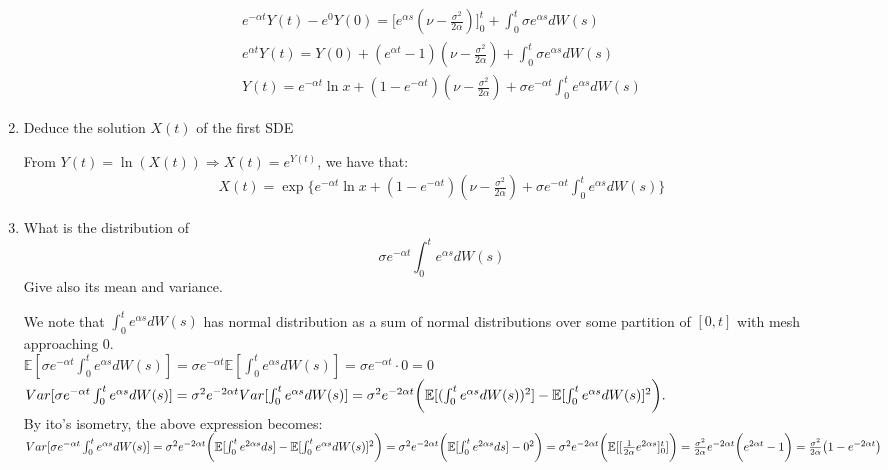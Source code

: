 \documentclass[12pt,twoside, letter]{exam}
\theoremstyle{definition}
\newcommand{\ee}{\mathbb{E}}
\begin{document}
\begin{enumerate}
\begin{solution}
\begin{align*}
          e^{-\alpha t}Y(t) - e^{0}Y(0) = \bigg[e^{\alpha s}(\nu - \frac{\sigma^2}{2\alpha}) \bigg]^t_0 + \int^t_0 \sigma e^{\alpha s} dW(s) \\
          e^{\alpha t}Y(t) = Y(0) + (e^{\alpha t} - 1)(\nu - \frac{\sigma^2}{2\alpha}) + \int^t_0 \sigma e^{\alpha s} dW(s) \\
          Y(t) = e^{-\alpha t}\ln{x} + (1 - e^{-\alpha t})(\nu - \frac{\sigma^2}{2\alpha}) + \sigma e^{-\alpha t}\int^t_0  e^{\alpha s} dW(s)
         \end{align*}
      \end{solution}
    \item Deduce the solution $X(t)$ of the first SDE
      \begin{solution}
        From $Y(t) = \ln{(X(t))} \Rightarrow X(t) = e^{Y(t)}$, we have that:
        \begin{align*}
          X(t) = \exp\bigg\{e^{-\alpha t}\ln{x} + (1 - e^{-\alpha t})(\nu - \frac{\sigma^2}{2\alpha}) + \sigma e^{-\alpha t}\int^t_0  e^{\alpha s} dW(s) \bigg\}
        \end{align*}
      \end{solution}
    \item What is the distribution of
      \begin{equation*}
        \sigma e^{-\alpha t}\int^t_0 e^{\alpha s}dW(s)
      \end{equation*}
      Give also its mean and variance.
      \begin{solution}
        We note that $\int^t_0 e^{\alpha s} dW(s)$ has normal distribution as a sum of normal distributions over some partition of $[0,t]$ with mesh
        approaching 0. \\
        $\ee[\sigma e^{-\alpha t}\int^t_0 e^{\alpha s}dW(s)] = \sigma e^{-\alpha t} \ee[\int^t_0 e^{\alpha s}dW(s)] = \sigma e^{-\alpha t} \cdot 0 = 0$\\
        $Var[\sigma e^{-\alpha t}\int^t_0 e^{\alpha s}dW(s)] = \sigma^2 e^{-2\alpha t} Var[\int^t_0 e^{\alpha s}dW(s)] \\
        = \sigma^2 e^{-2\alpha t} \bigg(\ee[(\int^t_0 e^{\alpha s}dW(s))^2] - \ee[\int^t_0 e^{\alpha s}dW(s)]^2 \bigg).$ \\
        By ito's isometry, the above expression becomes: \\
        $Var[\sigma e^{-\alpha t}\int^t_0 e^{\alpha s}dW(s)]
        = \sigma^2 e^{-2\alpha t} \bigg(\ee[\int^t_0 e^{2\alpha s} ds] - \ee[\int^t_0 e^{\alpha s}dW(s)]^2 \bigg) \\
        = \sigma^2 e^{-2\alpha t} \bigg(\ee[\int^t_0 e^{2\alpha s} ds] - 0^2 \bigg) =
        \sigma^2 e^{-2\alpha t} \bigg(\ee[[\frac{1}{2\alpha}e^{2\alpha s}]^t_0] \bigg) \\
        = \frac{\sigma^2}{2\alpha} e^{-2\alpha t} \bigg(e^{2\alpha t} - 1 \bigg) = \frac{\sigma^2}{2\alpha}\big(1 - e^{-2\alpha t} \big)$


\end{solution}
\end{enumerate}
\end{document}
